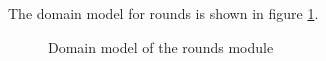 The domain model for rounds is shown in figure \ref{fig:rounds_domainModel}.

\begin{figure}[htb]
\begin{center}
\end{center}
\caption{ Domain model of the rounds module \label{fig:rounds_domainModel}}
\end{figure}

